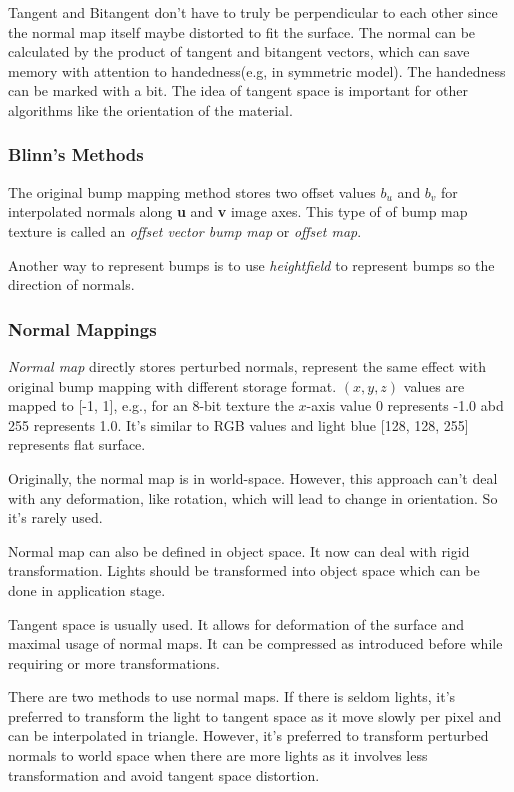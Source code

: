 \documentclass[10pt, a4paper]{article}
\begin{document}
Tangent and Bitangent don't have to truly be perpendicular to each other since the normal map itself maybe distorted to fit the surface. The normal can be calculated by the product of tangent and bitangent vectors, which can save memory with attention to handedness(e.g, in symmetric model). The handedness can be marked with a bit. The idea of tangent space is important for other algorithms like the orientation of the material. 

    \subsubsection{Blinn's Methods}
        The original bump mapping method stores two offset values $b_u$ and $b_v$ for interpolated normals along \textbf{u} and \textbf{v} image axes. This type of of bump map texture is called an \emph{offset vector bump map} or \emph{offset map}.

        Another way to represent bumps is to use \emph{heightfield} to represent bumps so the direction of normals. 
        
    \subsubsection{Normal Mappings}
        \emph{Normal map} directly stores perturbed normals, represent the same effect with original bump mapping with different storage format. $(x,y,z)$ values are mapped to [-1, 1], e.g., for an 8-bit texture the $x$-axis value 0 represents -1.0 abd 255 represents 1.0. It's similar to RGB values and light blue [128, 128, 255] represents flat surface. 

        Originally, the normal map is in world-space. However, this approach can't deal with any deformation, like rotation, which will lead to change in orientation. So it's rarely used. 

        Normal map can also be defined in object space. It now can deal with rigid transformation. Lights should be transformed into object space which can be done in application stage. 

        Tangent space is usually used. It allows for deformation of the surface and maximal usage of normal maps. It can be compressed as introduced before while requiring or more transformations. 

        There are two methods to use normal maps. If there is seldom lights, it's preferred to transform the light to tangent space as it move slowly per pixel and can be interpolated in triangle. However, it's preferred to transform perturbed normals to world space when there are more lights as it involves less transformation and avoid tangent space distortion. 
\end{document}
